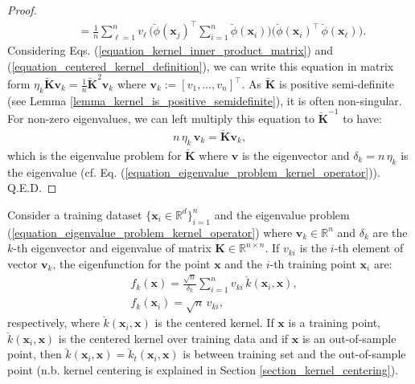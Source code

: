 \documentclass[lang=cn,10pt]{gorgeousnbook}
\numberwithin{equation}{section}%
\numberwithin{figure}{section}%
\begin{document}
\begin{proof}
\begin{align*}
&~~~~~~ =\frac{1}{n} \sum_{\ell=1}^n v_\ell\, \Big( \breve{\phi}(\boldsymbol{x}_j)^\top \sum_{i=1}^n \breve{\phi}(\boldsymbol{x}_i) \Big) \Big( \breve{\phi}(\boldsymbol{x}_i)^\top\, \breve{\phi}(\boldsymbol{x}_\ell) \Big).
\end{align*}
Considering Eqs. (\ref{equation_kernel_inner_product_matrix}) and (\ref{equation_centered_kernel_definition}), we can write this equation in matrix form $\eta_k \breve{\boldsymbol{K}} \boldsymbol{v}_k = \frac{1}{n} \breve{\boldsymbol{K}}^2 \boldsymbol{v}_k$ where $\boldsymbol{v}_k := [v_1, \dots, v_n]^\top$. As $\breve{\boldsymbol{K}}$ is positive semi-definite (see Lemma \ref{lemma_kernel_is_positive_semidefinite}), it is often non-singular. For non-zero eigenvalues, we can left multiply this equation to $\breve{\boldsymbol{K}}^{-1}$ to have:
\begin{align*}
n\, \eta_k\, \boldsymbol{v}_k = \breve{\boldsymbol{K}} \boldsymbol{v}_k,
\end{align*}
which is the eigenvalue problem for $\breve{\boldsymbol{K}}$ where $\boldsymbol{v}$ is the eigenvector and $\delta_k = n\, \eta_k$ is the eigenvalue (cf. Eq. (\ref{equation_eigenvalue_problem_kernel_operator})). Q.E.D.
\end{proof}

\begin{lemma} \label{lemma_relation_eigenfunctions_eigenvectors_for_kernel}
Consider a training dataset $\{\boldsymbol{x}_i \in \mathbb{R}^d\}_{i=1}^n$ and the eigenvalue problem (\ref{equation_eigenvalue_problem_kernel_operator}) where $\boldsymbol{v}_k \in \mathbb{R}^n$ and $\delta_k$ are the $k$-th eigenvector and eigenvalue of matrix $\boldsymbol{K} \in \mathbb{R}^{n \times n}$.
If $v_{ki}$ is the $i$-th element of vector $\boldsymbol{v}_k$, the eigenfunction for the point $\boldsymbol{x}$ and the $i$-th training point $\boldsymbol{x}_i$ are:
\begin{align}
&f_k(\boldsymbol{x}) = \frac{\sqrt{n}}{\delta_k} \sum_{i=1}^n v_{ki}\, \breve{k}(\boldsymbol{x}_i, \boldsymbol{x}), \label{equation_relation_eigenfunction_eigenvector_x} \\
&f_k(\boldsymbol{x}_i) = \sqrt{n}\, v_{ki}, \label{equation_relation_eigenfunction_eigenvector_x_i}
\end{align}
respectively, where $\breve{k}(\boldsymbol{x}_i, \boldsymbol{x})$ is the centered kernel. 
If $\boldsymbol{x}$ is a training point, $\breve{k}(\boldsymbol{x}_i, \boldsymbol{x})$ is the centered kernel over training data and if $\boldsymbol{x}$ is an out-of-sample point, then $\breve{k}(\boldsymbol{x}_i, \boldsymbol{x}) = \breve{k}_t(\boldsymbol{x}_i, \boldsymbol{x})$ is between training set and the out-of-sample point (n.b. kernel centering is explained in Section \ref{section_kernel_centering}). 
\end{lemma}
\end{document}
